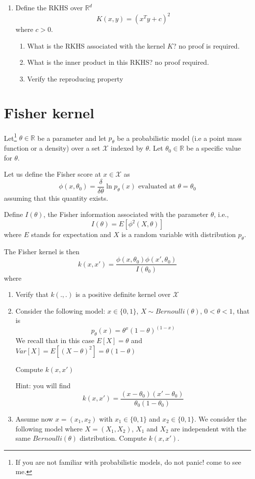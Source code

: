 \documentclass{article}[12pt]
\begin{document}
\begin{enumerate}
\begin{enumerate}
\end{enumerate}
\item Define the RKHS  over $\mathbb{R}^d$
$$K(x,y)=(x^Ty+c)^2$$
where $c>0$. 
\begin{enumerate}
\item
What is the RKHS associated with the kernel $K$? no proof is required. 
\item 
What is the inner product in this RKHS? no proof required.  
\item 
Verify the reproducing property
\end{enumerate}
\end{enumerate}
\section{Fisher kernel} 
Let\footnote{If you are not familiar with probabilistic models, do not panic! come to see me.} $\theta \in \mathbb{R}$ be a parameter and let $p_\theta$ be a probabilistic model (i.e a point mass function or a density) over a set $\mathcal{X}$ indexed by $\theta$. Let $\theta_0 \in \mathbb{R}$ be a specific value for $\theta$.

Let us define the Fisher score at $x \in \mathcal{X}$ as
\begin{equation}
\phi(x,\theta_0) = \frac{\delta}{\delta \theta} \ln p_\theta(x) \mbox{ evaluated at } \theta=\theta_0
\end{equation}
assuming that this quantity exists. 

Define $I(\theta)$, the Fisher information associated with the parameter $\theta$, i.e., 
\begin{equation}
I(\theta)=E[\phi^2(X,\theta)]
\end{equation}
where $E$ stands for expectation and $X$ is a random variable with distribution $p_\theta$. 

The Fisher kernel is then 
\begin{equation}
k(x,x')=\frac{\phi(x,\theta_0)\phi(x',\theta_0)}{I(\theta_0)}
\end{equation}
where 
\begin{enumerate}
\item Verify that $k(.,.)$ is a positive definite kernel over $\mathcal{X}$
\item Consider the following model: $x \in \{0,1\}$, $X \sim Bernoulli(\theta)$, $0 < \theta < 1$, that is
\begin{equation}
p_\theta(x)=\theta^x(1-\theta)^{(1-x)} 
\end{equation}
We recall that in this case $E[X]=\theta$ and $Var[X]=E[(X-\theta)^2]=\theta(1-\theta)$

Compute $k(x,x')$

Hint: you will find $$k(x,x')=\frac{(x-\theta_0)(x'-\theta_0)}{\theta_0(1-\theta_0)}$$
\item
Assume now $x=(x_1,x_2)$ with $x_1 \in \{0,1\}$ and $x_2 \in \{0,1\}$. 
We consider the following model where $X=(X_1,X_2)$, $X_1$ and $X_2$ are independent with the same $Bernoulli(\theta)$ distribution. 
Compute $k(x,x')$. 
\end{enumerate}
 
\end{document}
